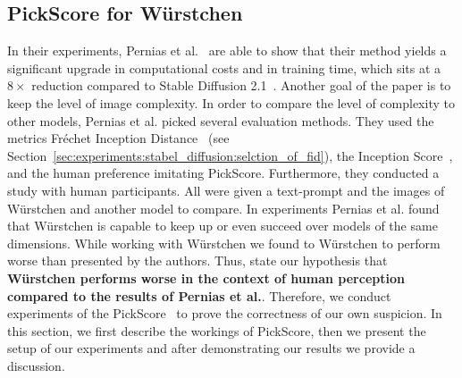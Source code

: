 \subsection{PickScore for W\"urstchen}
In their experiments, Pernias et al.~\cite{pernias2024wrstchen} are able to show
that their method yields a significant upgrade in computational costs and in
training time, which sits at a $8\times$ reduction compared to Stable Diffusion
2.1~\cite{rombach2023sd_2_1}. Another goal of the paper is to keep the level of
image complexity. In order to compare the level of complexity to other models,
Pernias et al. picked several evaluation methods. They used the metrics
Fr\'echet Inception Distance~\cite{heusel2018ganstrainedtimescaleupdate} (see
Section~\ref{sec:experiments:stabel_diffusion:selction_of_fid}), the Inception
Score~\cite{ding2021cogviewmasteringtexttoimagegeneration}, and the human preference imitating
PickScore. Furthermore, they conducted a study with human participants. All were
given a text-prompt and the images of W\"urstchen and another model to compare.
In experiments Pernias et al. found that W\"urstchen is capable to keep up or
even succeed over models of the same dimensions. While working with W\"urstchen
we found to W\"urstchen to perform worse than presented by the authors. Thus,
state our hypothesis that \textbf{W\"urstchen performs worse in the context of
    human perception compared to the results of Pernias et al.}. Therefore, we
conduct experiments of the PickScore~\cite{kirstain2023pickapic} to
prove the correctness of our own suspicion. In this section, we first describe
the workings of PickScore, then we present the setup of our experiments and
after demonstrating our results we provide a discussion.

